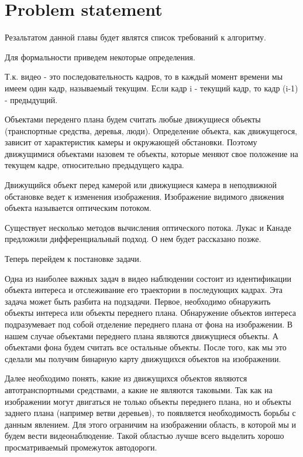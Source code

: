 \documentclass[12pt,a4paper,oneside,titlepage]{article}
\begin{document}
\newpage
\section*{Problem statement}
Резальтатом данной главы будет являтся список требований к алгоритму.

Для формальности приведем некоторые определения.

Т.к. видео - это последовательность кадров, то в каждый момент времени мы имеем один кадр, называемый текущим.
Если кадр i - текущий кадр, то кадр (i-1) - предыдущий.

Объектами переденго плана будем считать любые движущиеся объекты (транспортные средства, деревья, люди).
Определение объекта, как движущегося, зависит от характеристик камеры и окружающей обстановки.
Поэтому движущимися объектами назовем те объекты, которые меняют свое положение на текущем кадре, относительно предыдущего кадра.

Движущийся объект перед камерой или движущиеся камера в неподвижной обстановке ведет к изменения изображения.
Изображение видимого движения объекта называется оптическим потоком.

Существует несколько методов вычисления оптического потока.
Лукас и Канаде предложили дифференциальный подход.
О нем будет рассказано позже.

Теперь перейдем к постановке задачи.

Одна из наиболее важных задач в видео наблюдении состоит из идентификации объекта интереса и отслеживание его траектории в последующих кадрах.
Эта задача может быть разбита на подзадачи.
Первое, необходимо обнаружить объекты интереса или объекты переднего плана.
Обнаружение объектов интереса подразумевает под собой отделение переднего плана от фона на изображении.
В нашем случае объектами переднего плана являются движущиеся объекты.
А объектами фона будем считать все остальные объекты.
После того, как мы это сделали мы получим бинарную карту движущихся объектов на изображении.

Далее необходимо понять, какие из движущихся объектов являются автотранспортными средствами, а какие не являются таковыми. 
Так как на изображении могут двигаться не только объекты переднего плана, но и объекты заднего плана (например ветви деревьев), то появляется необходимость борьбы с данным явлением.
Для этого ограничим на изображении область, в которой мы и будем вести видеонаблюдение. %
Такой областью лучше всего выделить хорошо просматриваемый промежуток автодороги.
\end{document}
